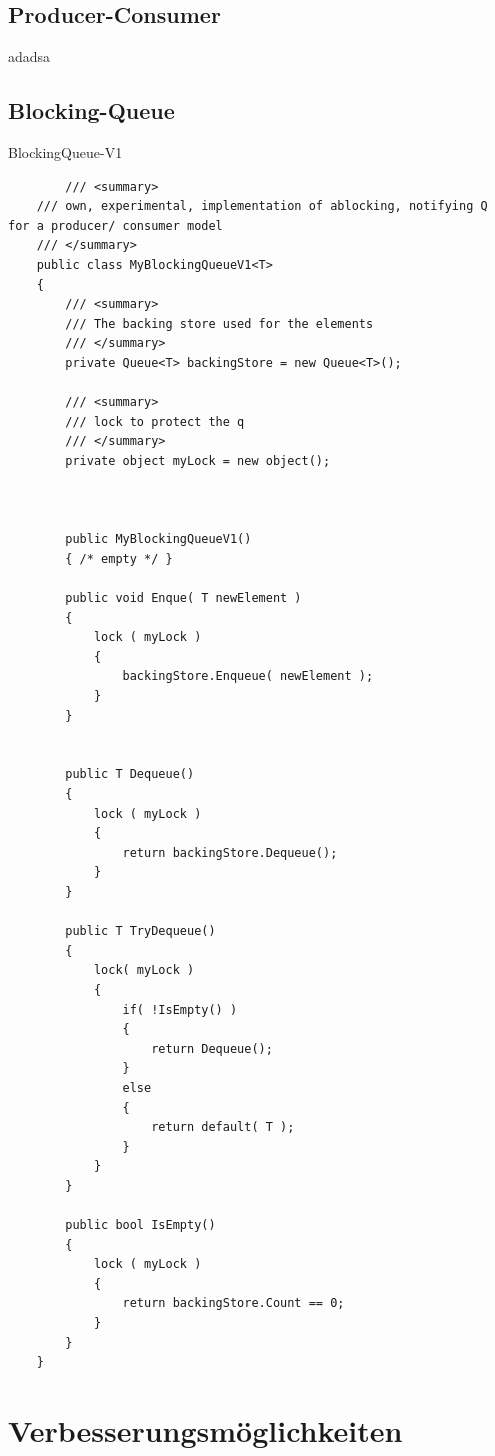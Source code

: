 \subsection{Producer-Consumer}
adadsa
\subsection{Blocking-Queue}
\lstlistingname{ BlockingQueue-V1}
\begin{lstlisting}
	    /// <summary>
	/// own, experimental, implementation of ablocking, notifying Q for a producer/ consumer model
	/// </summary>
	public class MyBlockingQueueV1<T>
	{
		/// <summary>
		/// The backing store used for the elements
		/// </summary>
		private Queue<T> backingStore = new Queue<T>();
		
		/// <summary>
		/// lock to protect the q
		/// </summary>
		private object myLock = new object();
		
		
		
		public MyBlockingQueueV1()
		{ /* empty */ }
		
		public void Enque( T newElement )
		{
			lock ( myLock )
			{
				backingStore.Enqueue( newElement );
			}
		}
		
		
		public T Dequeue()
		{
			lock ( myLock )
			{
				return backingStore.Dequeue();
			}
		}
		
		public T TryDequeue()
		{
			lock( myLock )
			{
				if( !IsEmpty() )
				{
					return Dequeue();
				}
				else
				{
					return default( T );
				}
			}
		}
		
		public bool IsEmpty()
		{
			lock ( myLock )
			{
				return backingStore.Count == 0;
			}
		}
	}
\end{lstlisting}
\section{Verbesserungsmöglichkeiten}
\chapterend
